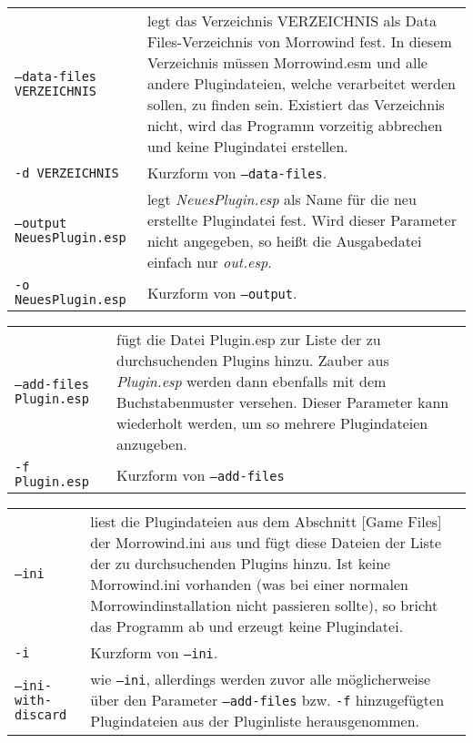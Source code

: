 \documentclass[12pt,oneside,a4paper]{article}
\begin{document}
\begin{tabular}{p{7cm} p{8cm}}
\texttt{--data-files VERZEICHNIS} & legt das Verzeichnis VERZEICHNIS als Data Files-Verzeichnis von Morrowind fest. In diesem Verzeichnis m\"{u}ssen Morrowind.esm und alle andere Plugindateien, welche verarbeitet werden sollen, zu finden sein. Existiert das Verzeichnis nicht, wird das Programm vorzeitig abbrechen und keine Plugindatei erstellen.\\
\texttt{-d VERZEICHNIS}           & Kurzform von \texttt{--data-files}.\\
\texttt{--output NeuesPlugin.esp} & legt \textit{NeuesPlugin.esp} als Name f\"{u}r die neu erstellte Plugindatei fest. Wird dieser Parameter nicht angegeben, so heißt die Ausgabedatei einfach nur \textit{out.esp}.\\
\texttt{-o NeuesPlugin.esp}       & Kurzform von \texttt{--output}.\\
\end{tabular}
\newline
\begin{tabular}{p{7cm} p{8cm}}
\texttt{--add-files Plugin.esp}   & f\"{u}gt die Datei Plugin.esp zur Liste der zu durchsuchenden Plugins hinzu. Zauber aus \textit{Plugin.esp} werden dann ebenfalls mit dem Buchstabenmuster versehen. Dieser Pa\-ra\-me\-ter kann wiederholt werden, um so mehrere Plugindateien anzugeben.\\
\texttt{-f Plugin.esp}            & Kurzform von \texttt{--add-files}\\
\end{tabular}
\newline
\begin{tabular}{p{7cm} p{8cm}}
\texttt{--ini}                    & liest die Plugindateien aus dem Abschnitt [Game Files] der Morrowind.ini aus und f\"{u}gt diese Dateien der Liste der zu durchsuchenden Plugins hinzu. Ist keine Morrowind.ini vorhanden (was bei einer normalen Morrowindinstallation nicht passieren sollte), so bricht das Programm ab und erzeugt keine Plugindatei.\\
\texttt{-i}                       & Kurzform von \texttt{--ini}.\\
\texttt{--ini-with-discard}       & wie \texttt{--ini}, allerdings werden zuvor alle m\"{o}glicherweise \"{u}ber den Parameter \texttt{--add-files} bzw. \texttt{-f} hinzugef\"{u}gten Plugindateien aus der Pluginliste herausgenommen.\\
\end{tabular}
\newline
\end{document}
